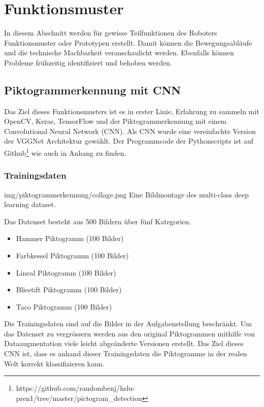 \newpage
\section{Funktionsmuster}
In diesem Abschnitt werden für gewisse Teilfunktionen des Roboters Funktionsmuster oder Prototypen erstellt. Damit können die Bewegungsabläufe und die technische Machbarkeit veranschaulicht werden. Ebenfalls können Probleme frühzeitig identifiziert und behoben werden.
\subsection{Piktogrammerkennung mit CNN}
\label{piktogrammerkennungMitCNN}
Das Ziel dieses Funktionsmusters ist es in erster Linie, Erfahrung zu sammeln mit OpenCV, Keras, TensorFlow und der Piktogrammerkennung mit einem Convolutional Neural Network (CNN). Als CNN wurde eine vereinfachte Version der VGGNet Architektur gewählt.
Der Programmcode der Pythonscripts ist auf Github\footnote{https://github.com/randombenj/hslu-pren1/tree/master/pictogram\_detection} wie auch in Anhang zu finden.

\subsubsection{Trainingsdaten}
\image
   {img/piktogrammerkennung/collage.png}
   {Eine Bildmontage des multi-class deep learning dataset.}
   
Das Datenset besteht aus 500 Bildern über fünf Kategorien.
\begin{itemize}
    \item Hammer Piktogramm (100 Bilder)
    \item Farbkessel Piktogramm (100 Bilder)
    \item Lineal Piktogramm (100 Bilder)
    \item Bliestift Piktogramm (100 Bilder)
    \item Taco Piktogramm (100 Bilder)
 \end{itemize}
 
Die Trainingsdaten sind auf die Bilder in der Aufgabenstellung beschränkt. Um das Datenset zu vergrössern werden aus den original Piktogrammen mithilfe von Dataaugmentation viele leicht abgeänderte Versionen erstellt. Das Ziel dieses CNN ist, dass es anhand dieser Trainingsdaten die Piktogramme in der realen Welt korrekt klassifizieren kann. %

